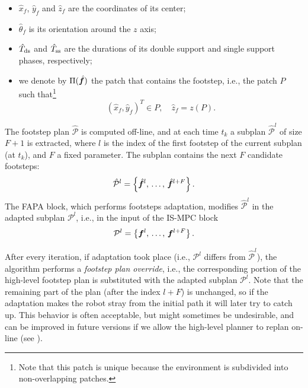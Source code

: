 \begin{itemize}
\item $\hat x_f$, $\hat y_f$ and $\hat z_f$ are the coordinates of its center;
\item $\hat\theta_f$ is its orientation around the $z$ axis;
\item $\hat T_{\rm ds}$ and $\hat T_{\rm ss}$ are the durations of its  double support and single support phases, respectively;
\item we denote by $\Pi(\hat{{\bm{f}}})$ the patch that contains the footstep, i.e., the patch $P$ such that\footnote{Note that this patch is unique because the environment is subdivided into non-overlapping patches.}
\[
(\hat{x}_f, \hat{y}_f)^T \in P,\quad \hat{z}_f = z(P).
\]
\end{itemize}


The footstep plan $\mathcal{\hat P}$ is computed off-line, and at each time $t_k$ a subplan $\mathcal{\hat P}^l$ of size $F+1$ is extracted, where $l$ is the index of the first footstep of the current subplan (at $t_k$), and $F$ a fixed parameter. The subplan contains the next $F$ candidate footsteps:
\begin{equation*}
\mathcal{\hat P}^l = \left\{
\hat{{\bm{f}}}^{l},\,\dots,\,\hat{{\bm{f}}}^{l+F}
\right\}.
\end{equation*}
The FAPA block, which performs footsteps adaptation, modifies $\mathcal{\hat P}^l$ in the adapted subplan $\mathcal{P}^l$, i.e., in the input of the IS-MPC block
\begin{equation*}
\mathcal{P}^l = \left\{
{\bm{f}}^{l},\,\dots,\,{\bm{f}}^{l+F}
\right\}.
\end{equation*}

After every iteration, if adaptation took place (i.e., $\mathcal{P}^l$ differs from $\mathcal{\hat P}^l$), the algorithm performs a {\em footstep plan override}, i.e., the corresponding portion of the high-level footstep plan is substituted with the adapted subplan $\mathcal{P}^l$. Note that the remaining part of the plan (after the index $l+F$) is unchanged, so if the adaptation makes the robot stray from the initial path it will later try to catch up. This behavior is often acceptable, but might sometimes be undesirable, and can be improved in future versions if we allow the high-level planner to replan on-line (see \cite{Cipriano2023RAS}).

